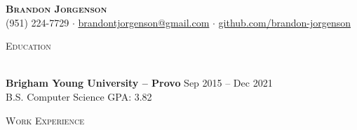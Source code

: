 \documentclass[letterpaper]{article}
\newcommand{\lineunder} {
    \vspace*{-8pt} \\
    \hspace*{-18pt} \hrulefill \\
}
\newcommand{\header} [1] {
    {\hspace*{-18pt}\vspace*{6pt} \textsc{#1}}
    \vspace*{-6pt} \lineunder
    \vspace{1mm}
}
\begin{document}
\vspace*{-40pt}

\vspace*{-10pt}
\begin{center}
	{\Huge \scshape \textbf {Brandon Jorgenson}}\\
    \vspace{1mm}
	(951) 224-7729 $\cdot$ \href{mailto:brandontjorgenson@gmail.com}{brandontjorgenson@gmail.com} $\cdot$ \href{https://github.com/brandon-jorgenson}{github.com/brandon-jorgenson}\\
\end{center}

\header{Education}
\textbf{Brigham Young University -- Provo} \hfill Sep 2015 -- Dec 2021\\
\vspace{.5mm}
B.S. Computer Science  \hfill GPA: 3.82\\
\vspace{2mm}

\header{Work Experience}
\end{document}
